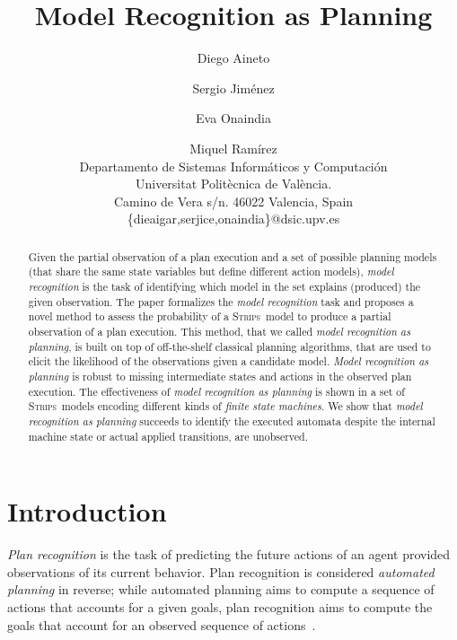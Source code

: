 \documentclass[letterpaper]{article} %
\newcommand{\strips}{\textsc{Strips}}     %
\begin{document}
\title{Model Recognition as Planning}

\author{Diego Aineto\and Sergio Jim\'enez\and Eva Onaindia \and Miquel Ram\'irez\\
{\small Departamento de Sistemas Inform\'aticos y Computaci\'on}\\
{\small Universitat Polit\`ecnica de Val\`encia.}\\
{\small Camino de Vera s/n. 46022 Valencia, Spain}\\
{\small \{dieaigar,serjice,onaindia\}@dsic.upv.es}}



\maketitle
\begin{abstract} 
Given the partial observation of a plan execution and a set of possible planning models (that share the same state variables but define different action models), {\em model recognition} is the task of identifying which model in the set explains (produced) the given observation. The paper formalizes the {\em model recognition} task and proposes a novel method to assess the probability of a \strips\ model to produce a partial observation of a plan execution. This method, that we called {\em model recognition as planning}, is built on top of off-the-shelf classical planning algorithms, that are used to elicit the likelihood of the observations given a candidate model. {\em Model recognition as planning} is robust to missing intermediate states and actions in the observed plan execution. The effectiveness of {\em model recognition as planning} is shown in a set of \strips\ models encoding different kinds of {\em finite state machines}. We show that {\em model recognition as planning} succeeds to identify the executed automata despite the internal machine state or actual applied transitions, are unobserved.
\end{abstract}

\section{Introduction}
\label{sec:introduction}
{\em Plan recognition} is the task of predicting the future actions of an agent provided observations of its current behavior. Plan recognition is considered {\em automated planning} in reverse; while automated planning aims to compute a sequence of actions that accounts for a given goals, plan recognition aims to compute the goals that account for an observed sequence of actions~\cite{geffner:book:2013}.
\end{document}
